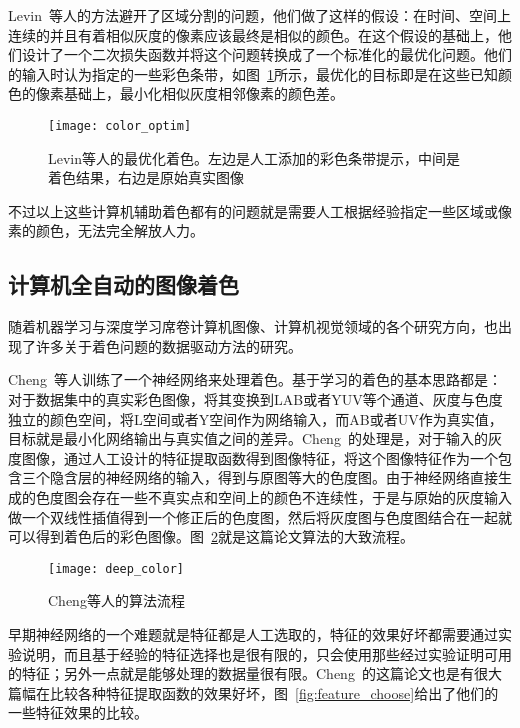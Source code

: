   Levin~\cite{journals/tog/LevinLW04}等人的方法避开了区域分割的问题，他们做了这样的假设：在时间、空间上连续的并且有着相似灰度的像素应该最终是相似的颜色。在这个假设的基础上，他们设计了一个二次损失函数并将这个问题转换成了一个标准化的最优化问题。他们的输入时认为指定的一些彩色条带，如图~\ref{fig:color_optim}所示，最优化的目标即是在这些已知颜色的像素基础上，最小化相似灰度相邻像素的颜色差。

  \begin{figure}[H]
    \centering
    \texttt{[image: color\_optim]}
    \caption[Levin等人的最优化着色]{Levin等人的最优化着色。左边是人工添加的彩色条带提示，中间是着色结果，右边是原始真实图像}
    \label{fig:color_optim}
  \end{figure}

  不过以上这些计算机辅助着色都有的问题就是需要人工根据经验指定一些区域或像素的颜色，无法完全解放人力。

\subsection{计算机全自动的图像着色}
\label{sec:2-automatic-color}

  随着机器学习与深度学习席卷计算机图像、计算机视觉领域的各个研究方向，也出现了许多关于着色问题的数据驱动方法的研究。

  Cheng~\cite{DBLP:journals/corr/ChengYS16}等人训练了一个神经网络来处理着色。基于学习的着色的基本思路都是：对于数据集中的真实彩色图像，将其变换到LAB或者YUV等个通道、灰度与色度独立的颜色空间，将L空间或者Y空间作为网络输入，而AB或者UV作为真实值，目标就是最小化网络输出与真实值之间的差异。Cheng~\cite{DBLP:journals/corr/ChengYS16}的处理是，对于输入的灰度图像，通过人工设计的特征提取函数得到图像特征，将这个图像特征作为一个包含三个隐含层的神经网络的输入，得到与原图等大的色度图。由于神经网络直接生成的色度图会存在一些不真实点和空间上的颜色不连续性，于是与原始的灰度输入做一个双线性插值得到一个修正后的色度图，然后将灰度图与色度图结合在一起就可以得到着色后的彩色图像。图~\ref{fig:deep_color}就是这篇论文算法的大致流程。

  \begin{figure}[H]
    \centering
    \texttt{[image: deep\_color]}
    \caption{Cheng等人的算法流程}
    \label{fig:deep_color}
  \end{figure}

  早期神经网络的一个难题就是特征都是人工选取的，特征的效果好坏都需要通过实验说明，而且基于经验的特征选择也是很有限的，只会使用那些经过实验证明可用的特征；另外一点就是能够处理的数据量很有限。Cheng~\cite{DBLP:journals/corr/ChengYS16}的这篇论文也是有很大篇幅在比较各种特征提取函数的效果好坏，图~\ref{fig:feature_choose}给出了他们的一些特征效果的比较。


